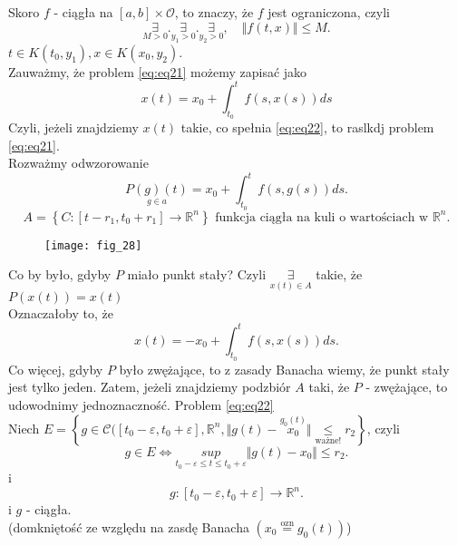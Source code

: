 \documentclass[../main.tex]{subfiles}
\begin{document}
        \begin{dowod}
            Skoro $f$ - ciągła na $[a,b]\times\mathcal{O}$, to znaczy, że $f$ jest ograniczona, czyli
            \[
                \underset{M>0}{\exists} . \underset{y_1>0}{\exists}. \underset{y_2>0}{\exists},\quad \Vert f(t,x) \Vert \leq M
            .\]
            $t\in K(t_0,y_1), x\in K(x_0,y_2)$.\\
            Zauważmy, że problem \ref{eq:eq21} możemy zapisać jako
            \begin{equation}\label{eq:eq22}
                x(t) = x_0 + \int_{t_0}^t f(s,x(s)) ds
            \end{equation}
            Czyli, jeżeli znajdziemy $x(t)$ takie, co spełnia \ref{eq:eq22}, to raslkdj problem \ref{eq:eq21}.\\
            Rozważmy odwzorowanie \[
                \underset{g\in a}{P(g)(t)} = x_0 + \int_{t_0}^t f(s,g(s))ds
            .\]
            \[
                A = \left\{ C: [t-r_1, t_0+r_1]\to \mathbb{R}^n \right\}\text{ funkcja ciągła na kuli o wartościach w }\mathbb{R}^n
            .\]
            \begin{figure}[h]
                \centering
                \texttt{[image: fig\_28]}
                \caption{}
                \label{fig:fig_28}
            \end{figure}
            Co by było, gdyby $P$ miało punkt stały?
            Czyli $\underset{x(t)\in A}{\exists}$ takie, że $P(x(t)) = x(t)$\\
            Oznaczałoby to, że \[
                x(t) = -x_0 + \int_{t_0}^t f(s,x(s))ds
            .\] Co więcej, gdyby $P$ było zwężające, to z zasady Banacha wiemy, że punkt stały jest tylko jeden. Zatem, jeżeli znajdziemy podzbiór $A$ taki, że $P$ - zwężające, to udowodnimy jednoznaczność. Problem \ref{eq:eq22}\\
            Niech $E = \left\{ g\in \mathcal{C}([t_0-\varepsilon,t_0+\varepsilon],\mathbb{R}^n, \Vert g(t) - \overset{g_0(t)}{x_0} \Vert \underset{\text{ważne!}}{\leq} r_2 \right\} $, czyli \[
                g\in E \iff \underset{t_0-\varepsilon\leq t\leq t_0+\varepsilon}{sup} \Vert g(t) - x_0 \Vert \leq r_2
            .\] i \[
            g: [t_0-\varepsilon, t_0+\varepsilon]\to\mathbb{R}^n
            .\] i $g$ - ciągła.\\
            (domkniętość ze względu na zasdę Banacha $(x_0 \overset{\text{ozn}}{=} g_0(t) )$)


\end{dowod}
\end{document}
